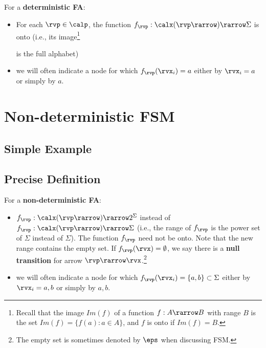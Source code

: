 \begin{mdframed}[hidealllines=true,backgroundcolor=blue!10]
For a {\bf deterministic FA}:
\begin{itemize}
\item For each $\rvp\in\calp$, the function $f_\rvp:\calx(\rvp\rarrow)\rarrow \Sigma$ is onto (i.e.,
its image\footnote{Recall that the image
$Im(f)$ of a function
$f:A\rarrow B$ with range $B$
is the set $Im(f)=\{f(a): a\in A\}$,
and $f$ is onto if $Im(f)=B$.}

is the full alphabet)

\item
we will often indicate a node for 
which $f_{\rvp}(\rvx_i)=a$ either by $\rvx_i=a$
or simply by $a$. 
\end{itemize}\end{mdframed}

\section{Non-deterministic FSM}
\subsection{Simple Example}
\subsection{Precise Definition}

\begin{mdframed}[hidealllines=true,backgroundcolor=blue!10]
For a {\bf non-deterministic FA}:
\begin{itemize}
\item
$f_\rvp:\calx(\rvp\rarrow)\rarrow 2^\Sigma$ 
instead of 
$f_\rvp:\calx(\rvp\rarrow)\rarrow \Sigma$ (i.e., the range of $f_\rvp$
is the power set of $\Sigma$ 
instead of $\Sigma$).
The function $f_\rvp$ need not be onto.
Note that the new range contains the empty set.
If $f_\rvp(\rvx)=\emptyset$, we say there is a  {\bf null transition} for arrow 
$\rvp\rarrow \rvx$.\footnote{The empty set is sometimes denoted by $\eps$ 
when discussing FSM.} 
\item
we will often indicate a node for 
which $f_{\rvp}(\rvx_i)=\{a,b\}\subset\Sigma$ either by $\rvx_i=a, b$
or simply by $a, b$. 
\end{itemize}\end{mdframed}
